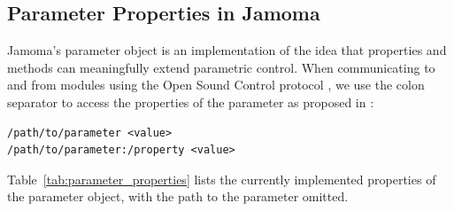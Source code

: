 \documentclass{article}
\begin{document}

\subsection{Parameter Properties in Jamoma} %

Jamoma's parameter object is an implementation of the idea that properties and methods can meaningfully extend parametric control. When communicating to and from modules using the Open Sound Control protocol \cite{Wright:2003}, we use the colon separator to access the properties of the parameter as proposed in \cite{Place:2008}:

\begin{small}
\begin{verbatim}
/path/to/parameter <value>
/path/to/parameter:/property <value>
\end{verbatim}
\end{small}

Table~\ref{tab:parameter_properties} lists the currently implemented properties of the parameter object, with the path to the parameter omitted.
\end{document}
